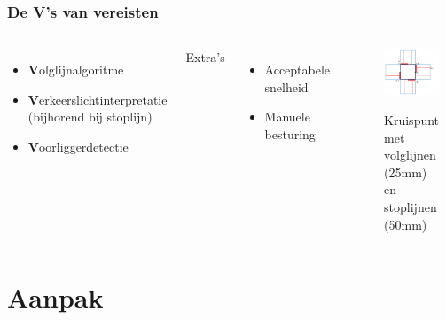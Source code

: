 \documentclass
   [kulak] %
   {kulakbeamer}
\begin{document}
\begin{frame}
\frametitle{De V's van vereisten}
\begin{columns}
	\begin{itemize}
		\item \textbf{V}olglijnalgoritme
		\item \textbf{V}erkeerslichtinterpretatie (bijhorend bij stoplijn)
		\item \textbf{V}oorliggerdetectie

	\end{itemize}
	Extra's
	\begin{itemize}
		\item Acceptabele snelheid
		\item Manuele besturing
	\end{itemize}
	
		\begin{figure}
			\centering
			\includegraphics[width=.95\textwidth]{volglijnenEnStoplijnen}
			\caption{Kruispunt met volglijnen (25mm) en stoplijnen (50mm)}\cite{OpgavePO2}
		\end{figure}
	
\end{columns}

\end{frame}



\section{Aanpak}
\end{document}
